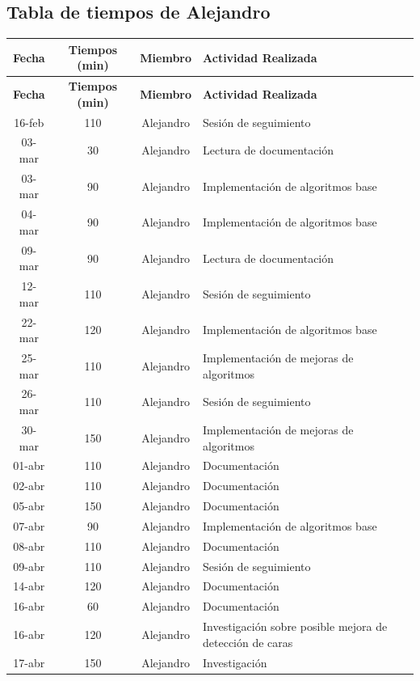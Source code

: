 \documentclass[a4paper]{article}
\begin{document}
\subsection{Tabla de tiempos de Alejandro}

\newpage

\begin{center}
\begin{longtable}{|c|c|c|p{8cm}|}
\hline
\textbf{Fecha} & \textbf{Tiempos (min)} & \textbf{Miembro} & \textbf{Actividad Realizada} \\
\hline
\endfirsthead
\hline
\textbf{Fecha} & \textbf{Tiempos (min)} & \textbf{Miembro} & \textbf{Actividad Realizada} \\
\hline
\endhead
16-feb & 110 & Alejandro & Sesión de seguimiento \\
03-mar & 30  & Alejandro & Lectura de documentación \\
03-mar & 90  & Alejandro & Implementación de algoritmos base \\
04-mar & 90  & Alejandro & Implementación de algoritmos base \\
09-mar & 90  & Alejandro & Lectura de documentación \\
12-mar & 110 & Alejandro & Sesión de seguimiento \\
22-mar & 120 & Alejandro & Implementación de algoritmos base \\
25-mar & 110 & Alejandro & Implementación de mejoras de algoritmos \\
26-mar & 110 & Alejandro & Sesión de seguimiento \\
30-mar & 150 & Alejandro & Implementación de mejoras de algoritmos \\
01-abr & 110 & Alejandro & Documentación \\
02-abr & 110 & Alejandro & Documentación \\
05-abr & 150 & Alejandro & Documentación \\
07-abr & 90  & Alejandro & Implementación de algoritmos base \\
08-abr & 110 & Alejandro & Documentación \\
09-abr & 110 & Alejandro & Sesión de seguimiento \\
14-abr & 120 & Alejandro & Documentación \\
16-abr & 60  & Alejandro & Documentación \\
16-abr & 120 & Alejandro & Investigación sobre posible mejora de detección de caras \\
17-abr & 150 & Alejandro & Investigación \\

\end{longtable}
\end{center}
\end{document}
